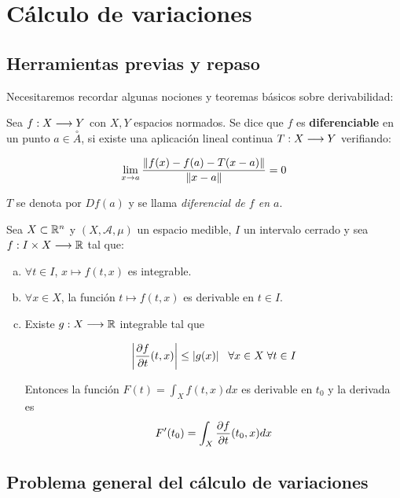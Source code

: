 
\section{Cálculo de variaciones}

\subsection{Herramientas previas y repaso}

Necesitaremos recordar algunas nociones y teoremas básicos sobre derivabilidad:

\begin{definition}
\label{funciondiferenciable}

Sea $f : X \longrightarrow Y$ con $X,Y$ espacios normados. Se dice que $f$ es \textbf{diferenciable} en un punto $a\in\overset{\circ}{A}$, si existe una aplicación lineal continua $T : X \longrightarrow Y$ verifiando:

\[
\displaystyle\lim_{ x \to a } \frac{\left\lVert f(x)-f(a)-T(x-a)\right\rVert}{\left\lVert x-a\right\rVert} = 0
\]

$T$ se denota por $Df(a)$ y se llama \textit{diferencial de $f$ en $a$}.
\end{definition}

\begin{theorem}
\label{derivadaparametro}
Sea $X\subset\mathbb{R}^n$ y $(X,\mathcal{A},\mu)$ un espacio medible, $I$ un intervalo cerrado y sea $f : I\times X \longrightarrow \mathbb{R}$ tal que:

\begin{enumerate}[(a)]
\item $\forall t \in I$, $x\mapsto f(t,x)$ es integrable.
\item $\forall x\in X$, la función $t\mapsto f(t,x)$ es derivable en $t\in I$.
\item Existe $g : X \longrightarrow \mathbb{R}$ integrable tal que

\[
\left|\frac{\partial f }{\partial t }(t,x)\right|\leq |g(x)| \;\;\; \forall x\in X\; \forall t \in I
\]

Entonces la función $F(t)=\int_Xf(t,x)dx$ es derivable en $t_0$ y la derivada es 
\[
F'(t_0)=\displaystyle\int_X\frac{\partial f }{\partial t }(t_0,x)dx
\]
\end{enumerate}

\end{theorem}

\subsection{Problema general del cálculo de variaciones}

